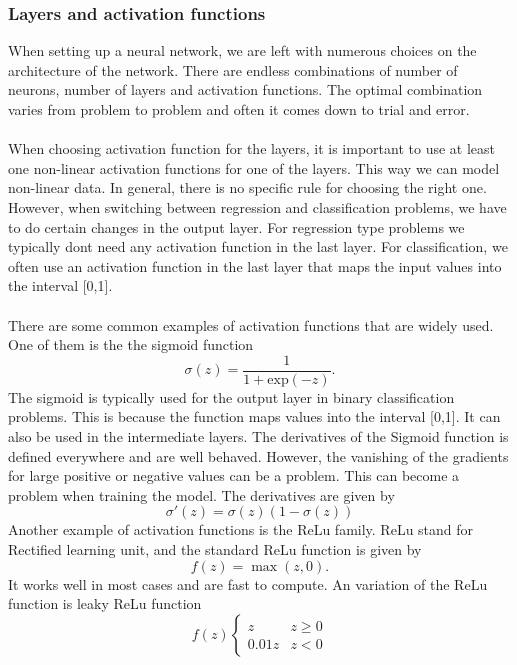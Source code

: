 \subsubsection{Layers and activation functions}
When setting up a neural network, we are left with numerous choices on the architecture of the network. There are endless combinations of number of neurons, number of layers and activation functions.  The optimal combination varies from problem to problem and often it comes down to trial and error. 
\\
\\
When choosing activation function for the layers, it is important to use at least one non-linear activation functions for one of the layers. This way we can model non-linear data. In general, there is no specific rule for choosing the right one. However, when switching between regression and classification problems, we have to do certain changes in the output layer. For regression type problems we typically dont need any activation function in the last layer. For classification, we often use an activation function in the last layer that maps the input values into the interval [0,1]. 
\\
\\
There are some common examples of activation functions that are widely used. One of them is the the sigmoid function 
\begin{equation}
    \sigma(z) = \frac{1}{1 + \text{exp}(-z)}.
\end{equation}
The sigmoid is typically used for the output layer in binary classification problems. This is because the function maps values into the interval [0,1]. It can also be used in the intermediate layers. The derivatives of the Sigmoid function is defined everywhere and are well behaved. However, the vanishing of the gradients for large positive or negative values can be a problem. \cite{Hands-On} This can become a problem when training the model. The derivatives are given by
\begin{equation}
    \sigma'(z) = \sigma(z)\left(1 - \sigma(z)\right)
\end{equation}
Another example of activation functions is the ReLu family. ReLu stand for Rectified learning unit, and the standard ReLu function is given by 
\begin{equation}
    f(z) =\max(z, 0).
\end{equation}
It works well in most cases and are fast to compute. An variation of the ReLu function is leaky ReLu function 
\begin{equation}
    f(z)\begin{cases}
    z & z \geq 0 \\
    0.01z & z < 0
    \end{cases}
\end{equation}
